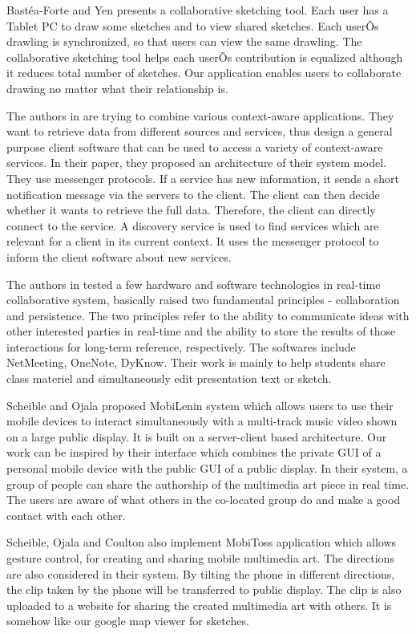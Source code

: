 \documentclass{chi2009}
\begin{document}
Bast\'{e}a-Forte and Yen \cite{brainstorming:marcello} presents a collaborative
sketching tool. Each user has a Tablet PC to draw some sketches and to view
shared sketches. Each userÕs drawling is synchronized, so that users can view
the same drawling. The collaborative sketching tool helps each userÕs
contribution is equalized although it reduces total number of sketches. Our
application enables users to collaborate drawing no matter what their
relationship is.

The authors in \cite{context:weis} are trying to combine various context-aware
applications. They want to retrieve data from different sources and services,
thus design a general purpose client software that can be used to access a
variety of context-aware services. In their paper, they proposed an
architecture of their system model. They use messenger protocols. If a service
has new information, it sends a short notification message via the servers to
the client. The client can then decide whether it wants to retrieve the full
data. Therefore, the client can directly connect to the service. A discovery
service is used to find services which are relevant for a client in its current
context. It uses the messenger protocol to inform the client software about new
services.

 The authors in \cite{ink:lindell} tested a few hardware and software
technologies in real-time collaborative system, basically raised two
fundamental principles - collaboration and persistence. The two principles
refer to the ability to communicate ideas with other interested parties in
real-time and the ability to store the results of those interactions for
long-term reference, respectively. The softwares include NetMeeting, OneNote,
DyKnow. Their work is mainly to help students share class materiel and
simultaneously edit presentation text or  sketch.

Scheible and Ojala \cite{mobilenin:scheible} proposed MobiLenin system which allows users to use their mobile devices to interact simultaneously with a multi-track music video shown on a large public display. It is built on a server-client based architecture. Our work can be inspired by their interface which combines the private GUI of a personal mobile device with the public GUI of a public display. In their system, a group of people can share the authorship of the multimedia art piece in real time. The users are aware of what others in the co-located group do and make a good contact with each other.

Scheible, Ojala and Coulton \cite{mobitoss:scheible} also implement MobiToss application which allows gesture control, for creating and sharing mobile multimedia art. The directions are also considered in their system. By tilting the phone in different directions, the clip taken by the phone will be transferred to public display. The clip is also uploaded to a website for sharing the created multimedia art with others. It is somehow like our google map viewer for sketches.
\end{document}

